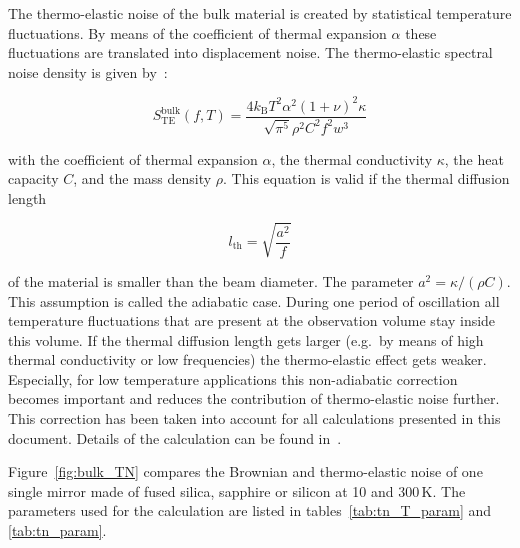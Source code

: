 The thermo-elastic noise of the bulk material is created by statistical temperature fluctuations. By means of the coefficient of thermal expansion $\alpha$ these fluctuations are translated into displacement noise. The thermo-elastic spectral noise density is given by~\cite{Braginsky1999a}:

\begin{equation}
S_\mathrm{TE}^\mathrm{bulk}(f,T) = \frac{4k_\mathrm{B}T^2\alpha^2(1+\nu)^2\kappa}{\sqrt{\pi^5}\rho^2C^2f^2w^3}
\label{eq:bulk_TE}
\end{equation}

with the coefficient of thermal expansion $\alpha$, the thermal conductivity $\kappa$, the heat capacity $C$, and the mass density $\rho$. This equation is valid if the thermal diffusion length 

\begin{equation}
l_\mathrm{th} = \sqrt{\frac{a^2}{f}}
\end{equation}

of the material is smaller than the beam diameter. The parameter $a^2 = \kappa/(\rho C)$. This assumption is called the adiabatic case. During one period of oscillation all temperature fluctuations that are present at the observation volume stay inside this volume. If the thermal diffusion length gets larger (e.g.\ by means of high thermal conductivity or low frequencies) the thermo-elastic effect gets weaker. Especially, for low temperature applications this non-adiabatic correction becomes important and reduces the contribution of thermo-elastic noise further. This correction has been taken into account for all calculations presented in this document. Details of the calculation can be found in~\cite{Cerdonio2001,Nawrodt2009_ET}.

Figure~\ref{fig:bulk_TN} compares the Brownian and thermo-elastic noise of one single mirror made of fused silica, sapphire or silicon at 10 and 300\,K. The parameters used for the calculation are listed in tables~\ref{tab:tn_T_param} and \ref{tab:tn_param}.

